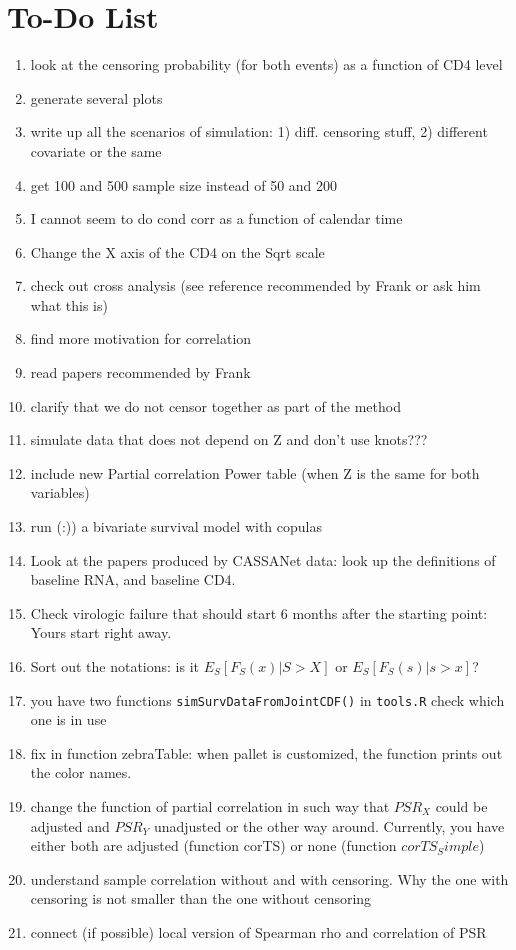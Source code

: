 \documentclass[]{article}
\begin{document}
\section{To-Do List}
\begin{enumerate}
  \item look at the censoring probability (for both events) as a function of CD4 level
  \item generate several plots
  \item write up all the scenarios of simulation: 1) diff. censoring stuff, 2) different covariate or the same
  \item get 100 and 500 sample size instead of 50 and 200
  \item I cannot seem to do cond corr as a function of calendar time
  \item Change the X axis of the CD4 on the Sqrt scale
  \item check out cross analysis (see reference recommended by Frank or ask him what this is)
  \item find more motivation for correlation
  \item read papers recommended by Frank
  \item clarify that we do not censor together as part of the method
  \item simulate data that does not depend on Z and don't use knots???
  \item include new Partial correlation Power table (when Z is the same for both variables)
  \item run (:)) a bivariate survival model with copulas  
  \item Look at the papers produced by CASSANet data: look up the definitions of baseline RNA, and baseline CD4.
  \item Check virologic failure that should start 6 months after the starting point: Yours start right away.
  \item Sort out the notations: is it $E_S[F_S(x)|S>X]$ or $E_S[F_S(s)|s>x]$?
  \item you have two functions \texttt{simSurvDataFromJointCDF()} in \texttt{tools.R} check which one is in use
  \item fix in function zebraTable: when pallet is customized, the function prints out the color names.
  \item change the function of partial correlation in such way that $PSR_X$ could be adjusted and $PSR_Y$ unadjusted or the other way around. Currently, you have either both are adjusted (function corTS) or none (function $corTS_Simple$)
  
  \item understand sample correlation without and with censoring. Why the one with censoring is not smaller than the one without censoring
  \item connect (if possible) local version of Spearman rho and correlation of PSR

\end{enumerate}
\end{document}
